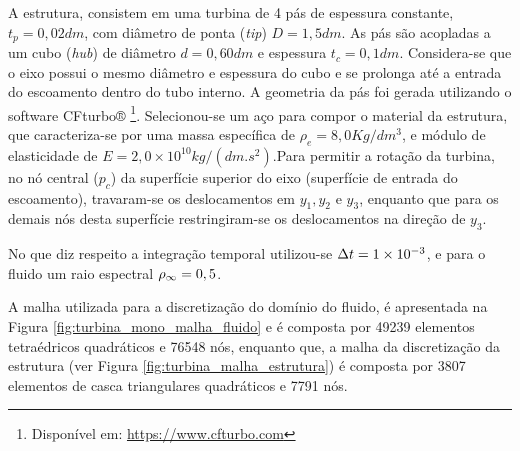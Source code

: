 A estrutura, consistem em uma turbina de 4 pás de espessura constante, $t_p = 0,02dm$, com diâmetro de ponta (\textit{tip}) $D=1,5dm$. As pás são acopladas a um cubo (\textit{hub}) de diâmetro $d=0,60dm$ e espessura $t_c = 0,1dm$. Considera-se que o eixo possui o mesmo diâmetro e espessura do cubo e se prolonga até a entrada do escoamento dentro do tubo interno. A geometria da pás foi gerada utilizando o software CFturbo® \footnote{Disponível em: \url{https://www.cfturbo.com}}. Selecionou-se um aço para compor o material da estrutura, que caracteriza-se por uma massa específica de $\rho_{e} =  8,0 Kg/dm^3 $, e módulo de elasticidade de $E = 2,0\times10^{10} kg/(dm.s^2)$.Para permitir a rotação da turbina, no nó central ($p_c$) da superfície superior do eixo (superfície de entrada do escoamento), travaram-se os deslocamentos em $y_1,y_2$ e $y_3$, enquanto que para os demais nós desta superfície restringiram-se os deslocamentos na direção de $y_3$.

No que diz respeito a integração temporal utilizou-se $\Delta t = 1\times10^{-3}$, e para o fluido um raio espectral $\rho_\infty = 0,5$.

A malha utilizada para a discretização do domínio do fluido, é apresentada na Figura \ref{fig:turbina_mono_malha_fluido} e é composta por 49239 elementos tetraédricos quadráticos e 76548 nós, enquanto que, a malha da discretização da estrutura (ver Figura \ref{fig:turbina_malha_estrutura}) é composta por 3807 elementos de casca triangulares quadráticos e 7791 nós.

